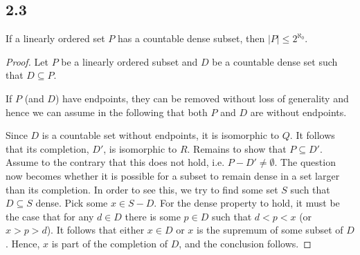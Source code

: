 \subsection*{2.3} If a linearly ordered set $P$ has a countable dense subset, then $|P| \leq 2^{\aleph_0}$.

\begin{proof}
Let $P$ be a linearly ordered subset and $D$ be a countable dense set such that $D \subseteq P$.

If $P$ (and $D$) have endpoints, they can be removed without loss of generality and hence we can assume in the following that both $P$ and $D$ are without endpoints.

Since $D$ is a countable set without endpoints, it is isomorphic to $Q$. It follows that its completion, $D'$, is isomorphic to $R$. Remains to show that $P \subseteq D'$. Assume to the contrary that this does not hold, i.e. $P - D' \neq \emptyset$. The question now becomes whether it is possible for a subset to remain dense in a set larger than its completion. In order to see this, we try to find some set $S$ such that $D \subseteq S$ dense. Pick some $x \in S - D$. For the dense property to hold, it must be the case that for any $d \in D$ there is some $p \in D$ such that $d < p < x$ (or $x > p > d$). It follows that either $x \in D$ or $x$ is the supremum of some subset of $D$. Hence, $x$ is part of the completion of $D$, and the conclusion follows.

\end{proof}


